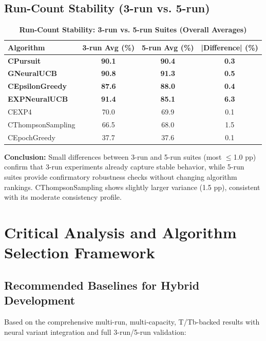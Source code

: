 \documentclass[12pt,a4paper]{article}
\newcommand{\success}[1]{\textcolor{successcolor}{\textbf{#1}}}
\newcommand{\legacy}[1]{\textcolor{legacycolor}{\textbf{#1}}}
\newcommand{\neural}[1]{\textcolor{neuralcolor}{\textbf{#1}}}
\begin{document}
\subsection{Run-Count Stability (3-run vs. 5-run)}

\begin{table}[H]
\centering
\caption{\success{Run-Count Stability: 3-run vs. 5-run Suites (Overall Averages)}}
\begin{tabular}{|l|c|c|c|}
\hline
\textbf{Algorithm} & \textbf{3-run Avg (\%)} & \textbf{5-run Avg (\%)} & \textbf{|Difference| (\%)} \\
\hline
\hline
\success{CPursuit}        & \success{90.1} & \success{90.4} & \success{0.3} \\
\neural{GNeuralUCB}       & \neural{90.8} & \neural{91.3} & \neural{0.5} \\
\success{CEpsilonGreedy} & \success{87.6} & \success{88.0} & \success{0.4} \\
\legacy{EXPNeuralUCB}    & \legacy{91.4} & \legacy{85.1} & \legacy{6.3} \\
CEXP4                    & 70.0          & 69.9          & 0.1 \\
CThompsonSampling        & 66.5          & 68.0          & 1.5 \\
CEpochGreedy             & 37.7          & 37.6          & 0.1 \\
\hline
\end{tabular}
\end{table}

\textbf{Conclusion:} Small differences between 3-run and 5-run suites (most $\leq$1.0 pp) confirm that 3-run experiments already capture stable behavior, while 5-run suites provide confirmatory robustness checks without changing algorithm rankings. CThompsonSampling shows slightly larger variance (1.5 pp), consistent with its moderate consistency profile.

\section{Critical Analysis and Algorithm Selection Framework}

\subsection{Recommended Baselines for Hybrid Development}

Based on the comprehensive multi-run, multi-capacity, T/Tb-backed results with neural variant integration and full 3-run/5-run validation:
\end{document}
